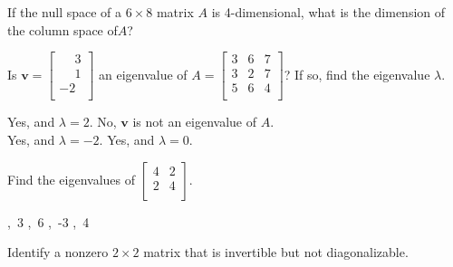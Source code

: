 \documentclass[11pt]{exam}
\begin{document}
\begin{questions}
\begin{oneparchoices}
\end{oneparchoices}
\answerline

\addpoints
\question[2]
If the null space of a $6 \times 8$ matrix $A$ is 4​-dimensional, what is the dimension of the column space of​ $A$?

\begin{oneparchoices}
\end{oneparchoices}
\answerline

\addpoints
\question[2]
Is $\mathbf{v}=\left[\begin{array}{c}\phantom{-}3 \\ \phantom{-}1 \\ -2 \\ \end{array}\right]$ an eigenvalue of $A=\left[\begin{array}{ccc} 3 & 6 & 7 \\ 3 & 2 & 7 \\ 5 & 6 & 4 \\ \end{array}\right]$? If so, find the eigenvalue $\lambda$.

\begin{oneparchoices}
\choice Yes, and $\lambda=2$.
\choice No, $\mathbf{v}$ is not an eigenvalue of $A$. \\ %
\choice Yes, and $\lambda=-2$.
\choice Yes, and $\lambda=0$.
\end{oneparchoices}
\answerline

\addpoints
\question[2]
Find the eigenvalues of $\left[\begin{array}{cc}4 & 2 \\ 2 & 4 \\ \end{array}\right]$.

\begin{oneparchoices}
,~3
,~6 %
,~-3
,~4
\end{oneparchoices}
\answerline

\addpoints
\question[2]
Identify a nonzero $2 \times 2$ matrix that is invertible but not diagonalizable.


\end{questions}
\end{document}
